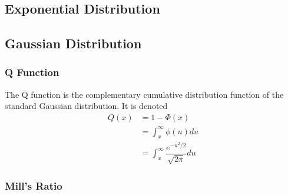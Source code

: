 \documentclass[11pt]{report} %
\begin{document}
\subsection{Exponential Distribution}

\subsection{Gaussian Distribution}

\subsubsection{Q Function}

The Q function is the complementary cumulative distribution function of the standard Gaussian distribution. It is denoted
\begin{align}
Q\left(x\right) &= 1 - \Phi\left(x\right) \\
&= \int_{x}^{\infty}\phi\left(u\right)du \\
&= \int_{x}^{\infty}\dfrac{e^{-u^{2}/2}}{\sqrt{2\pi}}du
\end{align}

\subsubsection{Mill's Ratio}
\end{document}
